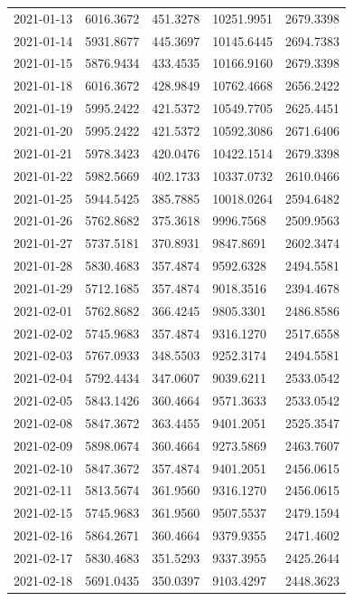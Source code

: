 \begin{footnotesize}
\begin{longtable}{lllll}
2021-01-13 & 6016.3672 & 451.3278 & 10251.9951 & 2679.3398 \\
2021-01-14 & 5931.8677 & 445.3697 & 10145.6445 & 2694.7383 \\
2021-01-15 & 5876.9434 & 433.4535 & 10166.9160 & 2679.3398 \\
2021-01-18 & 6016.3672 & 428.9849 & 10762.4668 & 2656.2422 \\
2021-01-19 & 5995.2422 & 421.5372 & 10549.7705 & 2625.4451 \\
2021-01-20 & 5995.2422 & 421.5372 & 10592.3086 & 2671.6406 \\
2021-01-21 & 5978.3423 & 420.0476 & 10422.1514 & 2679.3398 \\
2021-01-22 & 5982.5669 & 402.1733 & 10337.0732 & 2610.0466 \\
2021-01-25 & 5944.5425 & 385.7885 & 10018.0264 & 2594.6482 \\
2021-01-26 & 5762.8682 & 375.3618 & 9996.7568 & 2509.9563 \\
2021-01-27 & 5737.5181 & 370.8931 & 9847.8691 & 2602.3474 \\
2021-01-28 & 5830.4683 & 357.4874 & 9592.6328 & 2494.5581 \\
2021-01-29 & 5712.1685 & 357.4874 & 9018.3516 & 2394.4678 \\
2021-02-01 & 5762.8682 & 366.4245 & 9805.3301 & 2486.8586 \\
2021-02-02 & 5745.9683 & 357.4874 & 9316.1270 & 2517.6558 \\
2021-02-03 & 5767.0933 & 348.5503 & 9252.3174 & 2494.5581 \\
2021-02-04 & 5792.4434 & 347.0607 & 9039.6211 & 2533.0542 \\
2021-02-05 & 5843.1426 & 360.4664 & 9571.3633 & 2533.0542 \\
2021-02-08 & 5847.3672 & 363.4455 & 9401.2051 & 2525.3547 \\
2021-02-09 & 5898.0674 & 360.4664 & 9273.5869 & 2463.7607 \\
2021-02-10 & 5847.3672 & 357.4874 & 9401.2051 & 2456.0615 \\
2021-02-11 & 5813.5674 & 361.9560 & 9316.1270 & 2456.0615 \\
2021-02-15 & 5745.9683 & 361.9560 & 9507.5537 & 2479.1594 \\
2021-02-16 & 5864.2671 & 360.4664 & 9379.9355 & 2471.4602 \\
2021-02-17 & 5830.4683 & 351.5293 & 9337.3955 & 2425.2644 \\
2021-02-18 & 5691.0435 & 350.0397 & 9103.4297 & 2448.3623 \\

\end{longtable}
\end{footnotesize}
